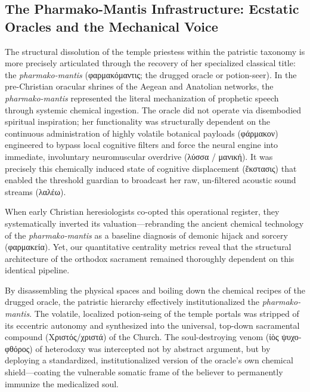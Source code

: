 \documentclass[11pt,twoside,a4paper]{article}
\begin{document}
\subsection{The Pharmako-Mantis Infrastructure: Ecstatic Oracles and the Mechanical Voice}
The structural dissolution of the temple priestess within the patristic taxonomy is more precisely articulated through the recovery of her specialized classical title: the \textit{pharmako-mantis} (\textgreek{φαρμακόμαντις}; the drugged oracle or potion-seer). In the pre-Christian oracular shrines of the Aegean and Anatolian networks, the \textit{pharmako-mantis} represented the literal mechanization of prophetic speech through systemic chemical ingestion. The oracle did not operate via disembodied spiritual inspiration; her functionality was structurally dependent on the continuous administration of highly volatile botanical payloads (\textgreek{φάρμακον}) engineered to bypass local cognitive filters and force the neural engine into immediate, involuntary neuromuscular overdrive (\textgreek{λύσσα / μανική}). It was precisely this chemically induced state of cognitive displacement (\textgreek{ἔκστασις}) that enabled the threshold guardian to broadcast her raw, un-filtered acoustic sound streams (\textgreek{λαλέω}).

When early Christian heresiologists co-opted this operational register, they systematically inverted its valuation—rebranding the ancient chemical technology of the \textit{pharmako-mantis} as a baseline diagnosis of demonic hijack and sorcery (\textgreek{φαρμακεία}). Yet, our quantitative centrality metrics reveal that the structural architecture of the orthodox sacrament remained thoroughly dependent on this identical pipeline. 

By disassembling the physical spaces and boiling down the chemical recipes of the drugged oracle, the patristic hierarchy effectively institutionalized the \textit{pharmako-mantis}. The volatile, localized potion-seing of the temple portals was stripped of its eccentric autonomy and synthesized into the universal, top-down sacramental compound (\textgreek{Χριστός/χριστά}) of the Church. The soul-destroying venom (\textgreek{ἰὸς ψυχοφθόρος}) of heterodoxy was intercepted not by abstract argument, but by deploying a standardized, institutionalized version of the oracle’s own chemical shield—coating the vulnerable somatic frame of the believer to permanently immunize the medicalized soul.
\end{document}
